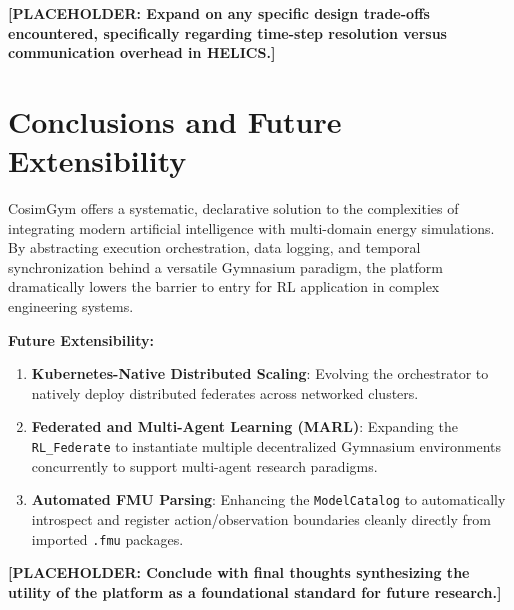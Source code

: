 \textbf{[PLACEHOLDER: Expand on any specific design trade-offs encountered, specifically regarding time-step resolution versus communication overhead in HELICS.]}

\section{Conclusions and Future Extensibility}
CosimGym offers a systematic, declarative solution to the complexities of integrating modern artificial intelligence with multi-domain energy simulations. By abstracting execution orchestration, data logging, and temporal synchronization behind a versatile Gymnasium paradigm, the platform dramatically lowers the barrier to entry for RL application in complex engineering systems.

\textbf{Future Extensibility:}
\begin{enumerate}
    \item \textbf{Kubernetes-Native Distributed Scaling}: Evolving the orchestrator to natively deploy distributed federates across networked clusters.
    \item \textbf{Federated and Multi-Agent Learning (MARL)}: Expanding the \texttt{RL\_Federate} to instantiate multiple decentralized Gymnasium environments concurrently to support multi-agent research paradigms.
    \item \textbf{Automated FMU Parsing}: Enhancing the \texttt{ModelCatalog} to automatically introspect and register action/observation boundaries cleanly directly from imported \texttt{.fmu} packages.
\end{enumerate}

\textbf{[PLACEHOLDER: Conclude with final thoughts synthesizing the utility of the platform as a foundational standard for future research.]}
